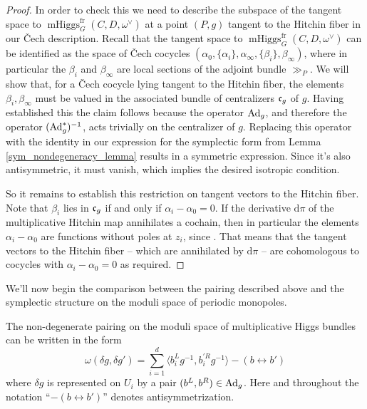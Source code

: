 \documentclass[10pt, oneside]{article}
\DeclareMathOperator{\mhiggs}{mHiggs}
\renewcommand{\d}{\mathrm{d}}
\newcommand{\fr}{\mathrm{fr}}
\newcommand{\Ad}{\mr{Ad}}
\begin{document}
\begin{proof}
In order to check this we need to describe the subspace of the tangent space to $\mhiggs^\fr_G(C,D,\omega^\vee)$ at a point $(P,g)$ tangent to the Hitchin fiber in our \v Cech description.  Recall that the tangent space to $\mhiggs^\fr_G(C,D,\omega^\vee)$ can be identified as the space of \v Cech cocycles $(\alpha_0, \{\alpha_i\}, \alpha_\infty, \{\beta_i\}, \beta_\infty)$, where in particular the $\beta_i$ and $\beta_\infty$ are local sections of the adjoint bundle $\gg_P$.  We will show that, for a \v Cech cocycle lying tangent to the Hitchin fiber, the elements $\beta_i, \beta_\infty$ must be valued in the associated bundle of centralizers $\mathfrak{c}_g$ of $g$.  Having established this the claim follows because the operator $\Ad_g$, and therefore the operator $(\Ad_g^*)^{-1}$, acts trivially on the centralizer of $g$.  Replacing this operator with the identity in our expression for the symplectic form from Lemma \ref{sym_nondegeneracy_lemma} results in a symmetric expression.  Since it's also antisymmetric, it must vanish, which implies the desired isotropic condition.

So it remains to establish this restriction on tangent vectors to the Hitchin fiber.  Note that $\beta_i$ lies in $\mathfrak{c}_g$ if and only if $\alpha_i - \alpha_0 = 0$.  If the derivative $\d \pi$ of the multiplicative Hitchin map annihilates a cochain, then in particular the elements $\alpha_i - \alpha_0$ are functions without poles at $z_i$, since .  That means that the tangent vectors to the Hitchin fiber -- which are annihilated by $\d \pi$ -- are cohomologous to cocycles with $\alpha_i - \alpha_0 = 0$ as required.
\end{proof}

We'll now begin the comparison between the pairing described above and the symplectic structure on the moduli space of periodic monopoles.

\begin{prop} \label{qconn_symp_description}
The non-degenerate pairing on the moduli space of multiplicative Higgs bundles can be written in the form
\begin{equation}
\label{eq:resid}
\omega(\delta g, \delta g') = \sum_{i=1}^d \langle b_i^L g^{-1}, b^{'R}_i g^{-1} \rangle - (b \leftrightarrow b')
\end{equation}
where $\delta g$ is represented on $U_i$ by a pair $(b^L, b^R) \in \Ad_g$.  Here and throughout the notation ``$- (b \leftrightarrow b')$'' denotes antisymmetrization.
\end{prop}
\end{document}
